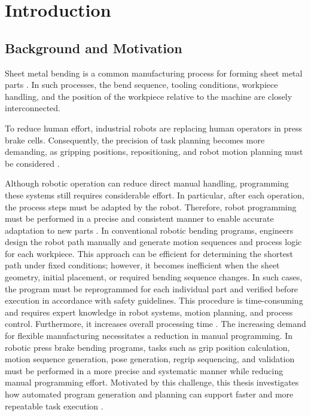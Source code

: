 
\chapter{Introduction}
\label{ch:introduction}


\section{Background and Motivation}
\label{sec:introduction-background-motivation}

Sheet metal bending is a common manufacturing process for forming sheet metal parts \cite{Gupta1998SheetMetalBending,Aomura2002RoboticBending}. In such processes, the bend sequence, tooling conditions, workpiece handling, and the position of the workpiece relative to the machine are closely interconnected.

To reduce human effort, industrial robots are replacing human operators in press brake cells. Consequently, the precision of task planning becomes more demanding, as gripping positions, repositioning, and robot motion planning must be considered \cite{Gupta1998SheetMetalBending,Aomura2002RoboticBending}.

Although robotic operation can reduce direct manual handling, programming these systems still requires considerable effort. In particular, after each operation, the process steps must be adapted by the robot. Therefore, robot programming must be performed in a precise and consistent manner to enable accurate adaptation to new parts \cite{Pan2012Survey,Neto2013OLP}.
In conventional robotic bending programs, engineers design the robot path manually and generate motion sequences and process logic for each workpiece. This approach can be efficient for determining the shortest path under fixed conditions; however, it becomes inefficient when the sheet geometry, initial placement, or required bending sequence changes. In such cases, the program must be reprogrammed for each individual part and verified before execution in accordance with safety guidelines. This procedure is time-consuming and requires expert knowledge in robot systems, motion planning, and process control. Furthermore, it increases overall processing time \cite{Pan2012Survey,Gupta1998SheetMetalBending,Aomura2002RoboticBending}.
The increasing demand for flexible manufacturing necessitates a reduction in manual programming. In robotic press brake bending programs, tasks such as grip position calculation, motion sequence generation, pose generation, regrip sequencing, and validation must be performed in a more precise and systematic manner while reducing manual programming effort. Motivated by this challenge, this thesis investigates how automated program generation and planning can support faster and more repeatable task execution \cite{Pan2012Survey,Gupta1998SheetMetalBending}.

